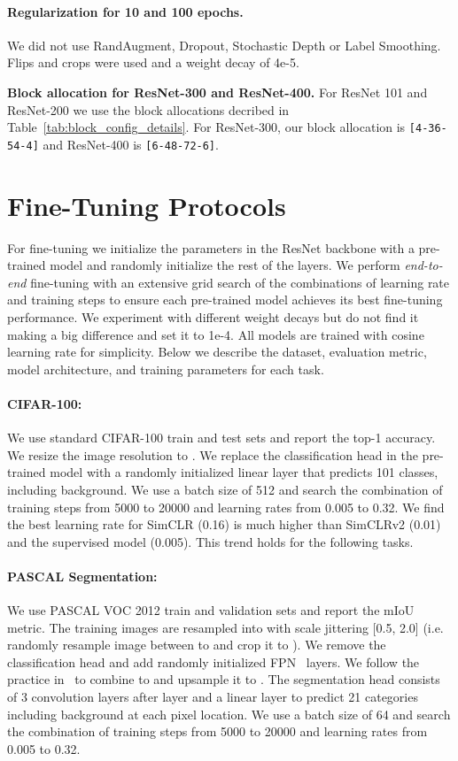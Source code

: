 \documentclass{article}
\begin{document}
\paragraph{Regularization for 10 and 100 epochs.} 
We did not use RandAugment, Dropout, Stochastic Depth or Label Smoothing. Flips and crops were used and a weight decay of 4e-5.

\textbf{Block allocation for ResNet-300 and ResNet-400.} 
For ResNet 101 and ResNet-200 we use the block allocations decribed in Table~\ref{tab:block_config_details}. For ResNet-300, our block allocation is \texttt{[4-36-54-4]} and ResNet-400 is \texttt{[6-48-72-6]}.

\section{Fine-Tuning Protocols}
For fine-tuning we initialize the parameters in the ResNet backbone with a pre-trained model and randomly initialize the rest of the layers. 
We perform \textit{end-to-end} fine-tuning with an extensive grid search of the combinations of learning rate and training steps to ensure each pre-trained model achieves its best fine-tuning performance. 
We experiment with different weight decays but do not find it making a big difference and set it to 1e-4. All models are trained with cosine learning rate for simplicity. 
Below we describe the dataset, evaluation metric, model architecture, and training parameters for each task.
\paragraph{CIFAR-100:} We use standard CIFAR-100 train and test sets and report the top-1 accuracy. We resize the image resolution to . We replace the classification head in the pre-trained model with a randomly initialized linear layer that predicts 101 classes, including background. We use a batch size of 512 and search the combination of training steps from 5000 to 20000 and learning rates from 0.005 to 0.32. We find the best learning rate for SimCLR (0.16) is much higher than SimCLRv2 (0.01) and the supervised model (0.005). This trend holds for the following tasks.

\paragraph{PASCAL Segmentation:} We use PASCAL VOC 2012 train and validation sets and report the mIoU metric. The training images are resampled into  with scale jittering [0.5, 2.0] (i.e. randomly resample image between  to  and crop it to ). We remove the classification head and add randomly initialized FPN~\cite{fpn} layers. We follow the practice in~\cite{zoph2020rethink} to combine  to  and upsample it to . The segmentation head consists of 3 convolution layers after  layer and a linear layer to predict 21 categories including background at each pixel location. We use a batch size of 64 and search the combination of training steps from 5000 to 20000 and learning rates from 0.005 to 0.32.
\end{document}
